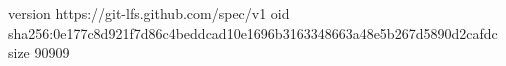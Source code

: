 version https://git-lfs.github.com/spec/v1
oid sha256:0e177c8d921f7d86c4beddcad10e1696b3163348663a48e5b267d5890d2cafdc
size 90909
